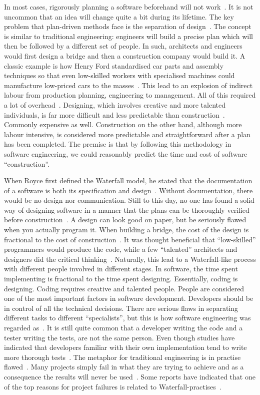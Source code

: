 \documentclass[english]{tktltiki2}
\begin{document}
In most cases, rigorously planning a software beforehand will not work~\cite{LB03}. It is not uncommon that an idea will change quite a bit during its lifetime. The key problem that plan-driven  methods face is the separation of design~\cite{LB03, Fow05}. The concept is similar to traditional engineering: engineers will build a precise plan which will then be followed by a different set of people. In such, architects and engineers would first design a bridge and then a construction company would build it. A classic example is how Henry Ford standardised car parts and assembly techniques so that even low-skilled workers with specialised machines could manufacture low-priced cars to the masses~\cite{Pop02}. This lead to an explosion of indirect labour from production planning, engineering to management. All of this required a lot of overhead~\cite{Pop02}. Designing, which involves creative and more talented individuals, is far more difficult and less predictable than construction~\cite{Fow05}. Commonly expensive as well. Construction on the other hand, although more labour intensive, is considered more predictable and straightforward after a plan has been completed. The premise is that by following this methodology in software engineering, we could reasonably predict the time and cost of software “construction”.

When Royce first defined the Waterfall model, he stated that the documentation of a software is both its specification and design~\cite{Roy70}. Without documentation, there would be no design nor communication. Still to this day, no one has found a solid way of designing software in a manner that the plans can be thoroughly verified before construction~\cite{Fow05}. A design can look good on paper, but be seriously flawed when you actually program it. When building a bridge, the cost of the design is fractional to the cost of construction~\cite{Fow05}. It was thought beneficial that “low-skilled” programmers would produce the code, while a few “talented” architects and designers did the critical thinking~\cite{Pop02}. Naturally, this lead to a Waterfall-like process with different people involved in different stages. In software, the time spent implementing is fractional to the time spent designing. Essentially, coding is designing. Coding requires creative and talented people. People are considered one of the most important factors in software development. Developers should be in control of all the technical decisions. There are serious flaws in separating different tasks to different “specialists”, but this is how software engineering was regarded as~\cite{Roy70}. It is still quite common that a developer writing the code and a tester writing the tests, are not the same person. Even though studies have indicated that developers familiar with their own implementation tend to write more thorough tests~\cite{MND09}. The metaphor for traditional engineering is in practise flawed~\cite{Fow05}. Many projects simply fail in what they are trying to achieve and as a consequence the results will never be used~\cite{LB03}. Some reports have indicated that one of the top reasons for project failures is related to Waterfall-practises~\cite{LB03}.
\end{document}
